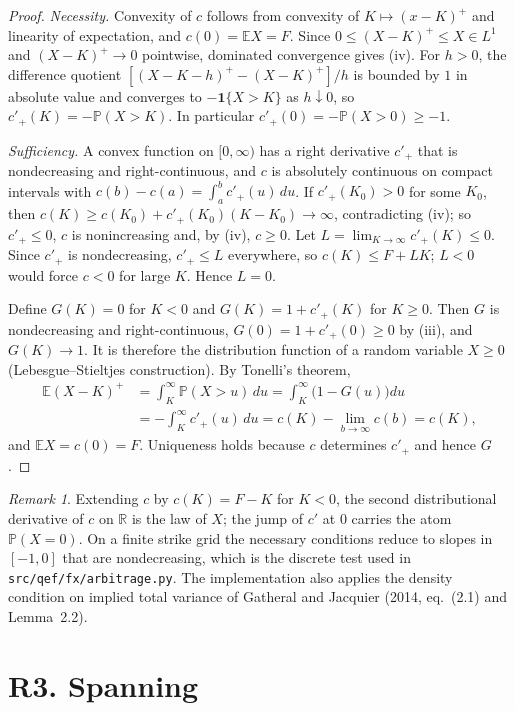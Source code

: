 \documentclass[11pt]{article}
\theoremstyle{remark}
\newtheorem{remark}[proposition]{Remark}
\newcommand{\E}{\mathbb{E}}
\renewcommand{\P}{\mathbb{P}}
\begin{document}
\begin{proof}
\emph{Necessity.} Convexity of $c$ follows from convexity of $K\mapsto(x-K)^+$ and linearity of expectation, and $c(0)=\E X=F$. Since $0\le(X-K)^+\le X\in L^1$ and $(X-K)^+\to0$ pointwise, dominated convergence gives (iv). For $h>0$, the difference quotient $[(X-K-h)^+-(X-K)^+]/h$ is bounded by $1$ in absolute value and converges to $-\mathbf 1\{X>K\}$ as $h\downarrow0$, so $c'_+(K)=-\P(X>K)$. In particular $c'_+(0)=-\P(X>0)\ge-1$.

\emph{Sufficiency.} A convex function on $[0,\infty)$ has a right derivative $c'_+$ that is nondecreasing and right-continuous, and $c$ is absolutely continuous on compact intervals with $c(b)-c(a)=\int_a^b c'_+(u)\,du$. If $c'_+(K_0)>0$ for some $K_0$, then $c(K)\ge c(K_0)+c'_+(K_0)(K-K_0)\to\infty$, contradicting (iv); so $c'_+\le0$, $c$ is nonincreasing and, by (iv), $c\ge0$. Let $L=\lim_{K\to\infty}c'_+(K)\le0$. Since $c'_+$ is nondecreasing, $c'_+\le L$ everywhere, so $c(K)\le F+LK$; $L<0$ would force $c<0$ for large $K$. Hence $L=0$.

Define $G(K)=0$ for $K<0$ and $G(K)=1+c'_+(K)$ for $K\ge0$. Then $G$ is nondecreasing and right-continuous, $G(0)=1+c'_+(0)\ge0$ by (iii), and $G(K)\to1$. It is therefore the distribution function of a random variable $X\ge0$ (Lebesgue--Stieltjes construction). By Tonelli's theorem,
\begin{align*}
\E(X-K)^+&=\int_K^\infty \P(X>u)\,du=\int_K^\infty\bigl(1-G(u)\bigr)du\\
&=-\int_K^\infty c'_+(u)\,du=c(K)-\lim_{b\to\infty}c(b)=c(K),
\end{align*}
and $\E X=c(0)=F$. Uniqueness holds because $c$ determines $c'_+$ and hence $G$.
\end{proof}

\begin{remark}
Extending $c$ by $c(K)=F-K$ for $K<0$, the second distributional derivative of $c$ on $\mathbb{R}$ is the law of $X$; the jump of $c'$ at $0$ carries the atom $\P(X=0)$. On a finite strike grid the necessary conditions reduce to slopes in $[-1,0]$ that are nondecreasing, which is the discrete test used in \texttt{src/qef/fx/arbitrage.py}. The implementation also applies the density condition on implied total variance of Gatheral and Jacquier (2014, eq.~(2.1) and Lemma~2.2).
\end{remark}

\section*{R3. Spanning}
\end{document}
